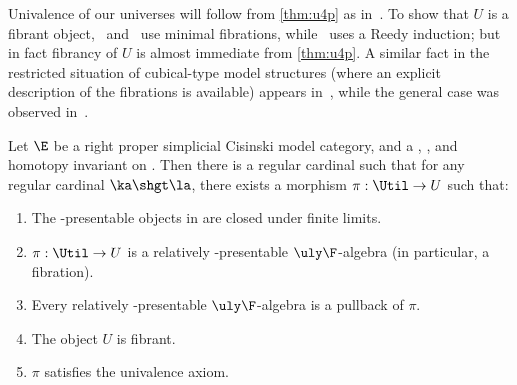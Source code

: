 Univalence of our universes will follow from \cref{thm:u4p} as in~\cite{klv:ssetmodel,shulman:elreedy,cisinski:elegant}.
To show that $U$ is a fibrant object,~\cite[Theorem 2.2.1]{klv:ssetmodel} and~\cite[Proposition 2.21]{cisinski:elegant} use minimal fibrations, while~\cite[Lemma 6.3]{shulman:elreedy} uses a Reedy induction; but in fact fibrancy of $U$ is almost immediate from \cref{thm:u4p}.
A similar fact in the restricted situation of cubical-type model structures (where an explicit description of the fibrations is available) appears in~\cite{cchm:cubicaltt,sattler:eqvext}, while the general case was observed in~\cite{stenzel:thesis}.

\begin{thm}\label{thm:uf-fibrant}
  Let $\E$ be a right proper simplicial Cisinski model category, and \F a \local, \stratified, and homotopy invariant \nfs on \E.
  Then there is a regular cardinal \la such that for any regular cardinal $\ka\shgt\la$, there exists a morphism $\pi:\Util \to U$ such that:
  \begin{enumerate}
  \item The \ka-presentable objects in \E are closed under finite limits.\label{item:uf0}
  \item $\pi:\Util \to U$ is a relatively \ka-presentable $\uly\F$-algebra (in particular, a fibration).\label{item:uf1}
  \item Every relatively \ka-presentable $\uly\F$-algebra is a pullback of $\pi$.\label{item:uf2}
  \item The object $U$ is fibrant.\label{item:uf4}
  \item $\pi$ satisfies the univalence axiom.\label{item:uf3}
  \end{enumerate}
\end{thm}
